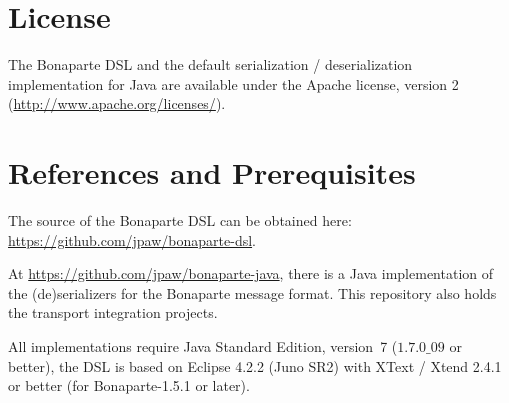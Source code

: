 \documentclass[11pt,a4paper,oneside]{article}
\begin{document}
\section{License}
The Bonaparte DSL and the default serialization / deserialization implementation for Java
are available under the Apache license, version 2 (\url{http://www.apache.org/licenses/}).

\section{References and Prerequisites}
The source of the Bonaparte DSL can be obtained here: \url{https://github.com/jpaw/bonaparte-dsl}.

At \url{https://github.com/jpaw/bonaparte-java}, there is a Java implementation of the (de)serializers for the Bonaparte message format. This repository also holds the transport integration projects.

All implementations require Java Standard Edition, version~7 ($1.7.0\_09$ or better), the DSL is based on Eclipse 4.2.2 (Juno
SR2) with XText / Xtend 2.4.1 or better (for Bonaparte-1.5.1 or later).
\end{document}
